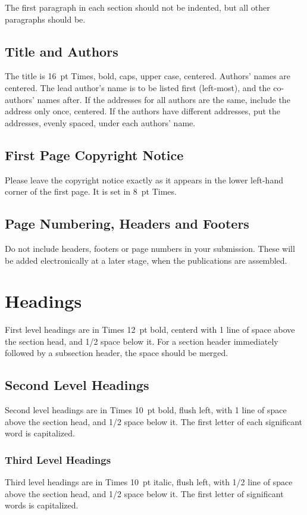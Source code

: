 \documentclass{article}
\begin{document}
The first paragraph in each section should not be indented,
but all other paragraphs should be.

\subsection{Title and Authors}
The title is 16~pt Times, bold, caps, upper case, centered. Authors' names are centered. The lead author's name is to be listed first (left-most), and the co-authors' names after. If the addresses for all authors are the same, include the address only once, centered. If the authors have different addresses, put the addresses, evenly spaced, under each authors' name.

\subsection{First Page Copyright Notice}
Please leave the copyright notice exactly as it appears in the lower left-hand corner of the first page. It is set in 8~pt Times.

\subsection{Page Numbering, Headers and Footers}
Do not include headers, footers or page numbers in your submission. These will be added electronically at a later stage, when the publications are assembled.

\section{Headings}
First level headings are in Times 12~pt bold, centerd with 1 line of space above the section head, and 1/2 space below it.
For a section header immediately followed by a subsection header, the space should be merged.

\subsection{Second Level Headings}
Second level headings are in Times 10~pt bold, flush left, with 1 line of space above the section head, and 1/2 space below it. The first letter of each significant word is capitalized.

\subsubsection{Third Level Headings}
Third level headings are in Times 10~pt italic, flush left, with 1/2 line of space above the section head, and 1/2 space below it. The first letter of significant words is capitalized.
\end{document}
